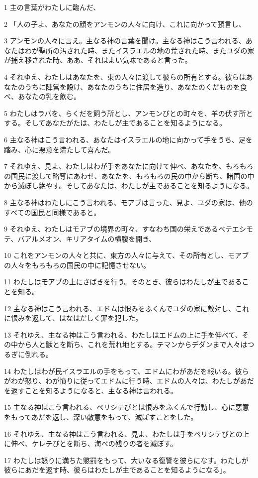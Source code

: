 \par 1 主の言葉がわたしに臨んだ、
\par 2 「人の子よ、あなたの顔をアンモンの人々に向け、これに向かって預言し、
\par 3 アンモンの人々に言え。主なる神の言葉を聞け。主なる神はこう言われる、あなたはわが聖所の汚された時、またイスラエルの地の荒された時、またユダの家が捕え移された時、ああ、それはよい気味であると言った。
\par 4 それゆえ、わたしはあなたを、東の人々に渡して彼らの所有とする。彼らはあなたのうちに陣営を設け、あなたのうちに住居を造り、あなたのくだものを食べ、あなたの乳を飲む。
\par 5 わたしはラバを、らくだを飼う所とし、アンモンびとの町々を、羊の伏す所とする。そしてあなたがたは、わたしが主であることを知るようになる。
\par 6 主なる神はこう言われる、あなたはイスラエルの地に向かって手をうち、足を踏み、心に悪意を満たして喜んだ。
\par 7 それゆえ、見よ、わたしはわが手をあなたに向けて伸べ、あなたを、もろもろの国民に渡して略奪にあわせ、あなたを、もろもろの民の中から断ち、諸国の中から滅ぼし絶やす。そしてあなたは、わたしが主であることを知るようになる。
\par 8 主なる神はわたしにこう言われる、モアブは言った、見よ、ユダの家は、他のすべての国民と同様であると。
\par 9 それゆえ、わたしはモアブの境界の町々、すなわち国の栄えであるベテエシモテ、バアルメオン、キリアタイムの横腹を開き、
\par 10 これをアンモンの人々と共に、東方の人々に与えて、その所有とし、モアブの人々をもろもろの国民の中に記憶させない。
\par 11 わたしはモアブの上にさばきを行う。そのとき、彼らはわたしが主であることを知る。
\par 12 主なる神はこう言われる、エドムは恨みをふくんでユダの家に敵対し、これに恨みを返して、はなはだしく罪を犯した。
\par 13 それゆえ、主なる神はこう言われる、わたしはエドムの上に手を伸べて、その中から人と獣とを断ち、これを荒れ地とする。テマンからデダンまで人々はつるぎに倒れる。
\par 14 わたしはわが民イスラエルの手をもって、エドムにわがあだを報いる。彼らがわが怒り、わが憤りに従ってエドムに行う時、エドムの人々は、わたしがあだを返すことを知るようになると、主なる神は言われる。
\par 15 主なる神はこう言われる、ペリシテびとは恨みをふくんで行動し、心に悪意をもってあだを返し、深い敵意をもって、滅ぼすことをした。
\par 16 それゆえ、主なる神はこう言われる、見よ、わたしは手をペリシテびとの上に伸べ、ケレテびとを断ち、海べの残りの者を滅ぼす。
\par 17 わたしは怒りに満ちた懲罰をもって、大いなる復讐を彼らになす。わたしが彼らにあだを返す時、彼らはわたしが主であることを知るようになる」。

